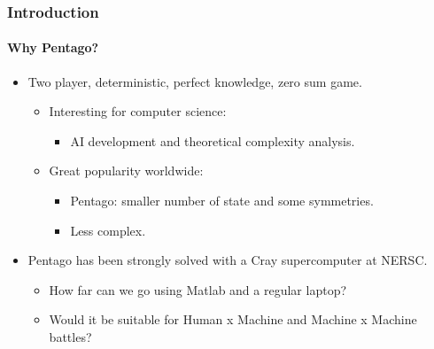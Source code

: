 \documentclass[10pt]{beamer}
\begin{document}
\begin{frame}
\frametitle{Introduction}
\framesubtitle{Why Pentago? }

	\begin{itemize}
	  
		\item Two player, deterministic, perfect knowledge, zero sum game.
		
			\begin{itemize}
			  \item Interesting for computer science:
			  		\begin{itemize}
			  		  \item  AI development and theoretical complexity analysis.
			  		\end{itemize}
			  \item Great popularity worldwide:
			  		\begin{itemize}
			  		  \item Pentago: smaller number of state and some symmetries.
			  		  \item Less complex.
			  		\end{itemize} 
			\end{itemize}
			
		\item Pentago has been strongly solved with a Cray supercomputer at NERSC.
		
			\begin{itemize}
			  
			  \item How far can we go using Matlab and a regular laptop?

			  \item Would it be suitable for Human x Machine and Machine x Machine
			  battles?
			  
			\end{itemize}

	\end{itemize}
\end{frame}
\end{document}
